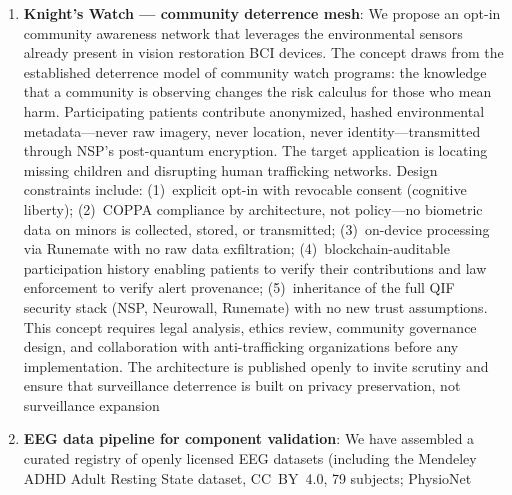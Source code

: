 \begin{enumerate}
        power-efficient rendering primitive for cortical visual prosthetics. We
        propose the neural terminal as a design target: a BCI-native interactive
        surface that gives patients full control over their AI assistants, data
        access, and device configuration, with blockchain-verified access logs
        ensuring tamper-proof transparency. The terminal paradigm is deliberately
        agnostic to application-layer evolution---terminals have persisted across
        every computing paradigm shift (CLI, GUI, mobile, spatial) and represent
        the most robust interface primitive for safety-critical neural applications
  \item \textbf{Knight's Watch --- community deterrence mesh}: We propose an
        opt-in community awareness network that leverages the environmental
        sensors already present in vision restoration BCI devices. The concept
        draws from the established deterrence model of community watch programs:
        the knowledge that a community is observing changes the risk calculus
        for those who mean harm. Participating patients contribute anonymized,
        hashed environmental metadata---never raw imagery, never location, never
        identity---transmitted through NSP's post-quantum encryption. The target
        application is locating missing children and disrupting human trafficking
        networks. Design constraints include: (1)~explicit opt-in with revocable
        consent (cognitive liberty); (2)~COPPA compliance by architecture, not
        policy---no biometric data on minors is collected, stored, or transmitted;
        (3)~on-device processing via Runemate with no raw data exfiltration;
        (4)~blockchain-auditable participation history enabling patients to verify
        their contributions and law enforcement to verify alert provenance;
        (5)~inheritance of the full QIF security stack (NSP, Neurowall, Runemate)
        with no new trust assumptions. This concept requires legal analysis,
        ethics review, community governance design, and collaboration with
        anti-trafficking organizations before any implementation. The architecture
        is published openly to invite scrutiny and ensure that surveillance
        deterrence is built on privacy preservation, not surveillance expansion
  \item \textbf{EEG data pipeline for component validation}: We have assembled a
        curated registry of openly licensed EEG datasets (including the Mendeley
        ADHD Adult Resting State dataset, CC~BY~4.0, 79 subjects; PhysioNet

\end{enumerate}
